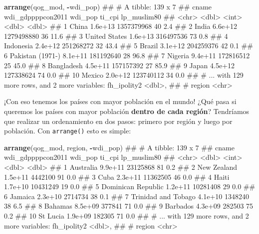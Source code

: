 \documentclass[]{book}
\newenvironment{Shaded}{\begin{snugshade}}{\end{snugshade}}
\newcommand{\KeywordTok}[1]{\textcolor[rgb]{0.13,0.29,0.53}{\textbf{#1}}}
\newcommand{\OperatorTok}[1]{\textcolor[rgb]{0.81,0.36,0.00}{\textbf{#1}}}
\newcommand{\NormalTok}[1]{#1}
\begin{document}
\begin{Shaded}
\begin{Highlighting}[]
\KeywordTok{arrange}\NormalTok{(qog_mod, }\OperatorTok{-}\NormalTok{wdi_pop)}
\NormalTok{## # A tibble: 139 x 7}
\NormalTok{##               cname wdi_gdppppcon2011    wdi_pop ti_cpi lp_muslim80}
\NormalTok{##               <chr>             <dbl>      <int>  <dbl>       <dbl>}
\NormalTok{##  1            China           1.6e+13 1357379968     40         2.4}
\NormalTok{##  2            India           6.6e+12 1279498880     36        11.6}
\NormalTok{##  3    United States           1.6e+13  316497536     73         0.8}
\NormalTok{##  4        Indonesia           2.4e+12  251268272     32        43.4}
\NormalTok{##  5           Brazil           3.1e+12  204259376     42         0.1}
\NormalTok{##  6 Pakistan (1971-)           8.1e+11  181192640     28        96.8}
\NormalTok{##  7          Nigeria           9.4e+11  172816512     25        45.0}
\NormalTok{##  8       Bangladesh           4.5e+11  157157392     27        85.9}
\NormalTok{##  9            Japan           4.5e+12  127338624     74         0.0}
\NormalTok{## 10           Mexico           2.0e+12  123740112     34         0.0}
\NormalTok{## # ... with 129 more rows, and 2 more variables: fh_ipolity2 <dbl>,}
\NormalTok{## #   region <chr>}
\end{Highlighting}
\end{Shaded}

¡Con eso tenemos los países con mayor población en el mundo! ¿Qué pasa
si queremos los países con mayor población \textbf{dentro de cada
región}? Tendríamos que realizar un ordenamiento en dos pasos: primero
por región y luego por población. Con \texttt{arrange()} esto es simple:

\begin{Shaded}
\begin{Highlighting}[]
\KeywordTok{arrange}\NormalTok{(qog_mod, region, }\OperatorTok{-}\NormalTok{wdi_pop)}
\NormalTok{## # A tibble: 139 x 7}
\NormalTok{##                  cname wdi_gdppppcon2011  wdi_pop ti_cpi lp_muslim80}
\NormalTok{##                  <chr>             <dbl>    <int>  <dbl>       <dbl>}
\NormalTok{##  1           Australia           9.9e+11 23125868     81         0.2}
\NormalTok{##  2         New Zealand           1.5e+11  4442100     91         0.0}
\NormalTok{##  3                Cuba           2.3e+11 11362505     46         0.0}
\NormalTok{##  4               Haiti           1.7e+10 10431249     19         0.0}
\NormalTok{##  5  Dominican Republic           1.2e+11 10281408     29         0.0}
\NormalTok{##  6             Jamaica           2.3e+10  2714734     38         0.1}
\NormalTok{##  7 Trinidad and Tobago           4.1e+10  1348240     38         6.5}
\NormalTok{##  8             Bahamas           8.5e+09   377841     71         0.0}
\NormalTok{##  9            Barbados           4.3e+09   282503     75         0.2}
\NormalTok{## 10            St Lucia           1.9e+09   182305     71         0.0}
\NormalTok{## # ... with 129 more rows, and 2 more variables: fh_ipolity2 <dbl>,}
\NormalTok{## #   region <chr>}
\end{Highlighting}
\end{Shaded}
\end{document}
